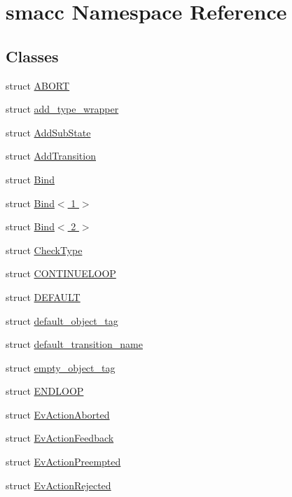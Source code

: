 \hypertarget{namespacesmacc}{}\section{smacc Namespace Reference}
\label{namespacesmacc}
\subsection*{Classes}
\begin{DoxyCompactItemize}
\item 
struct \hyperlink{structsmacc_1_1ABORT}{A\+B\+O\+RT}
\item 
struct \hyperlink{structsmacc_1_1add__type__wrapper}{add\+\_\+type\+\_\+wrapper}
\item 
struct \hyperlink{structsmacc_1_1AddSubState}{Add\+Sub\+State}
\item 
struct \hyperlink{structsmacc_1_1AddTransition}{Add\+Transition}
\item 
struct \hyperlink{structsmacc_1_1Bind}{Bind}
\item 
struct \hyperlink{structsmacc_1_1Bind_3_011_01_4}{Bind$<$ 1 $>$}
\item 
struct \hyperlink{structsmacc_1_1Bind_3_012_01_4}{Bind$<$ 2 $>$}
\item 
struct \hyperlink{structsmacc_1_1CheckType}{Check\+Type}
\item 
struct \hyperlink{structsmacc_1_1CONTINUELOOP}{C\+O\+N\+T\+I\+N\+U\+E\+L\+O\+OP}
\item 
struct \hyperlink{structsmacc_1_1DEFAULT}{D\+E\+F\+A\+U\+LT}
\item 
struct \hyperlink{structsmacc_1_1default__object__tag}{default\+\_\+object\+\_\+tag}
\item 
struct \hyperlink{structsmacc_1_1default__transition__name}{default\+\_\+transition\+\_\+name}
\item 
struct \hyperlink{structsmacc_1_1empty__object__tag}{empty\+\_\+object\+\_\+tag}
\item 
struct \hyperlink{structsmacc_1_1ENDLOOP}{E\+N\+D\+L\+O\+OP}
\item 
struct \hyperlink{structsmacc_1_1EvActionAborted}{Ev\+Action\+Aborted}
\item 
struct \hyperlink{structsmacc_1_1EvActionFeedback}{Ev\+Action\+Feedback}
\item 
struct \hyperlink{structsmacc_1_1EvActionPreempted}{Ev\+Action\+Preempted}
\item 
struct \hyperlink{structsmacc_1_1EvActionRejected}{Ev\+Action\+Rejected}

\end{DoxyCompactItemize}
